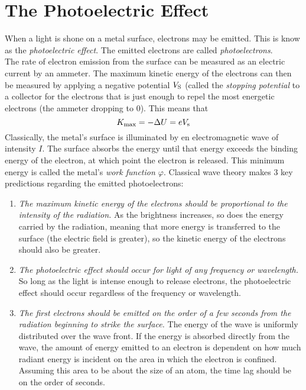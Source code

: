 \documentclass{subfiles}
\begin{document}
	\section{The Photoelectric Effect}
		When a light is shone on a metal surface, electrons may be emitted. This is know as the \textit{photoelectric effect}. The emitted electrons are called \textit{photoelectrons}. \\
			The rate of electron emission from the surface can be measured as an electric current by an ammeter. The maximum kinetic energy of the electrons can then be measured by applying a negative potential \(V_{\text{S}}\) (called the \textit{stopping potential} to a collector for the electrons that is just enough to repel the most energetic electrons (the ammeter dropping to 0). This means that
			\[
				K_{\text{max}} = -\Delta U
					= eV_{\text{s}}
			\]
			Classically, the metal's surface is illuminated by en electromagnetic wave of intensity \(I\). The surface absorbs the energy until that energy exceeds the binding energy of the electron, at which point the electron is released. This minimum energy is called the metal's \textit{work function \(\varphi\)}.
			Classical wave theory makes 3 key predictions regarding the emitted photoelectrons:
				\begin{enumerate}
					\item \textit{The maximum kinetic energy of the electrons should be proportional to the intensity of the radiation.}
						As the brightness increases, so does the energy carried by the radiation, meaning that more energy is transferred to the surface (the electric field is greater), so the kinetic energy of the electrons should also be greater.
					\item \textit{The photoelectric effect should occur	for light of any frequency or wavelength.}
						So long as the light is intense enough to release electrons, the photoelectric effect should occur regardless of the frequency or wavelength.
					\item \textit{The first electrons should be emitted on the order of a few seconds from the radiation beginning to strike the surface.}
						The energy of the wave is uniformly distributed over the wave front. If the energy is absorbed directly from the wave, the amount of energy emitted to an electron is dependent on how much radiant energy is incident on the area in which the electron is confined. Assuming this area to be about the size of an atom, the time lag should be on the order of seconds.
				\end{enumerate}
\end{document}

